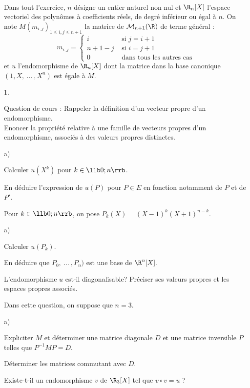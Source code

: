 \documentclass[11pt]{article}%
\begin{document}
\begin{exerciceAP}~\\
  Dans tout l'exercice, $n$ désigne un entier naturel non nul et
  $\R_n[X]$ l'espace vectoriel des polynômes à coefficients réels, de
  degré inférieur ou égal à $n$. On note $M (m_{i,j})_{1 \leq i,j \leq
    n+1}$ la matrice de $\mathcal{M}_{n+1} (\R)$ de terme général :
  \[
  m_{i,j} = \left\{ 
    \begin{array}{cc} 
      i & \text{ si } j = i+1 \\ 
      n + 1 - j & \text{ si } i = j + 1 \\ 
      0 & \text{ dans tous les autres cas } 
    \end{array} 
  \right. 
  \]
  et $u$ l'endomorphisme de $\R_n[X]$ dont la matrice dans la base
  canonique $(1 , X ,\ \dots\ , X^n)$ est égale à $M$.
  \begin{noliste}{1.}
    \setlength{\itemsep}{2mm}
  \item Question de cours : Rappeler la définition d'un vecteur propre
    d'un endomorphisme. \\
    Enoncer la propriété relative à une famille de vecteurs propres
    d'un endomorphisme, associés à des valeurs propres distinctes.
  \item
    \begin{noliste}{a)}
    \setlength{\itemsep}{2mm} \item Calculer $u(X^k)$ pour $k \in \llb 0 ; n
      \rrb$.
    \item En déduire l'expression de $u(P)$ pour $P \in E$ en fonction
      notamment de $P$ et de $P'$.
    \end{noliste}
  \item Pour $k \in \llb 0 ; n \rrb$, on pose $P_k (X) = (X-1)^k
    (X+1)^{n-k}$.
    \begin{noliste}{a)}
    \setlength{\itemsep}{2mm} \item Calculer $u(P_k)$.
    \item En déduire que $P_0 ,\ \dots\ , P_n)$ est une base de
      $\R^n[X]$.
    \item L'endomorphisme $u$ est-il diagonalisable? Préciser ses
      valeurs propres et les espaces propres associés.
    \end{noliste}
  \item Dans cette question, on suppose que $n = 3$.
    \begin{noliste}{a)}
    \setlength{\itemsep}{2mm} 
    \item Expliciter $M$ et déterminer une matrice diagonale $D$ et
      une matrice inversible $P$ telles que $P^{-1} M P = D$.
    \item Déterminer les matrices commutant avec $D$.
    \item Existe-t-il un endomorphisme $v$ de $\R_3[X]$ tel que $v
      \circ v = u$ ?
    \end{noliste}
  \end{noliste}
\end{exerciceAP}
\end{document}
